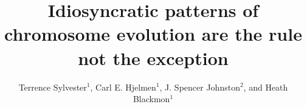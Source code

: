 \documentclass[]{rsos}%
\begin{document}
\title{Idiosyncratic patterns of chromosome evolution are the rule not the exception}

\author{%
Terrence Sylvester$^{1}$, Carl E. Hjelmen$^{1}$, J. Spencer Johnston$^{2}$, and Heath Blackmon$^{1}$}

\address{$^{1}$Department of Biology; Texas A\&M University; College Station, TX 77843, USA}
\address{$^{2}$Department of Entomology; Texas A\&M University; College Station, TX 77843, USA}


\subject{Evolutionary Biology}


\end{document}
